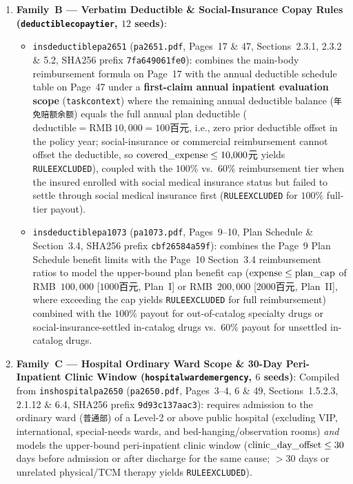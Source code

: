 \documentclass[10pt,twocolumn]{article}
\renewcommand{\_}{\textunderscore\allowbreak}
\begin{document}
\begin{enumerate}[leftmargin=*,nosep]
  \item \textbf{Family~B --- Verbatim Deductible \& Social-Insurance Copay Rules (\texttt{deductible\_copay\_tier}, $12$ seeds)}:
  \begin{itemize}[leftmargin=*,nosep]
    \item \texttt{ins\_deductible\_pa2651} (\texttt{pa\_2651.pdf}, Pages~17 \& 47, Sections~2.3.1, 2.3.2 \& 5.2, SHA256 prefix \texttt{7fa649061fe0}): combines the main-body reimbursement formula on Page~17 with the annual deductible schedule table on Page~47 under a \textbf{first-claim annual inpatient evaluation scope} (\texttt{task\_context}) where the remaining annual deductible balance (\texttt{年免赔额余额}) equals the full annual plan deductible ($\text{deductible} = \text{RMB}~10{,}000 = 100$百元, i.e., zero prior deductible offset in the policy year; social-insurance or commercial reimbursement cannot offset the deductible, so $\text{covered\_expense} \le 10{,}000$元 yields \texttt{RULE\_EXCLUDED}), coupled with the $100\%$ vs.\ $60\%$ reimbursement tier when the insured enrolled with social medical insurance status but failed to settle through social medical insurance first (\texttt{RULE\_EXCLUDED} for $100\%$ full-tier payout).
    \item \texttt{ins\_deductible\_pa1073} (\texttt{pa\_1073.pdf}, Pages~9--10, Plan Schedule \& Section~3.4, SHA256 prefix \texttt{cbf26584a59f}): combines the Page~9 Plan Schedule benefit limits with the Page~10 Section~3.4 reimbursement ratios to model the upper-bound plan benefit cap ($\text{expense} \le \text{plan\_cap}$ of RMB~$100{,}000$ [$1000$百元, Plan~I] or RMB~$200{,}000$ [$2000$百元, Plan~II], where exceeding the cap yields \texttt{RULE\_EXCLUDED} for full reimbursement) combined with the $100\%$ payout for out-of-catalog specialty drugs or social-insurance-settled in-catalog drugs vs.\ $60\%$ payout for unsettled in-catalog drugs.
  \end{itemize}
  \item \textbf{Family~C --- Hospital Ordinary Ward Scope \& 30-Day Peri-Inpatient Clinic Window (\texttt{hospital\_ward\_emergency}, $6$ seeds)}: Compiled from \texttt{ins\_hospital\_pa2650} (\texttt{pa\_2650.pdf}, Pages~3--4, 6 \& 49, Sections~1.5.2.3, 2.1.12 \& 6.4, SHA256 prefix \texttt{9d93c137aac3}): requires admission to the ordinary ward (\texttt{普通部}) of a Level-2 or above public hospital (excluding VIP, international, special-needs wards, and bed-hanging/observation rooms) \emph{and} models the upper-bound peri-inpatient clinic window ($\text{clinic\_day\_offset} \le 30$ days before admission or after discharge for the same cause; $> 30$ days or unrelated physical/TCM therapy yields \texttt{RULE\_EXCLUDED}).

\end{enumerate}
\end{document}
